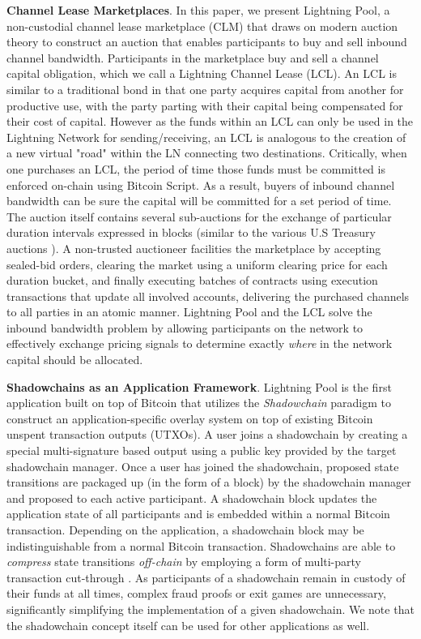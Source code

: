 \documentclass[10pt,a4paper]{article}
\theoremstyle{definition}
\begin{document}
\textbf{Channel Lease Marketplaces}. In this paper, we present Lightning Pool,
a non-custodial channel lease marketplace (CLM) that draws on modern auction
theory to construct an auction that enables participants to buy and sell
inbound channel bandwidth. Participants in the marketplace buy and sell a
channel capital obligation, which we call a Lightning Channel Lease (LCL). An
LCL is similar to a traditional bond in that one party acquires capital from
another for productive use, with the party parting with their capital being
compensated for their cost of capital. However as the funds within an LCL can
only be used in the Lightning Network for sending/receiving, an LCL is
analogous to the creation of a new virtual "road" within the LN connecting two
destinations. Critically, when one purchases an LCL, the period of time those
funds must be committed is enforced on-chain using Bitcoin Script. As a result,
buyers of inbound channel bandwidth can be sure the capital will be committed
for a set period of time. The auction itself contains several sub-auctions for
the exchange of particular duration intervals expressed in blocks (similar to
the various U.S Treasury auctions \cite{usTreasury}). A non-trusted auctioneer
facilities the marketplace by accepting sealed-bid orders, clearing the market
using a uniform clearing price for each duration bucket, and finally executing
batches of contracts using execution transactions that update all involved
accounts, delivering the purchased channels to all parties in an atomic manner.
Lightning Pool and the LCL solve the inbound bandwidth problem by allowing
participants on the network to effectively exchange pricing signals to
determine exactly \emph{where} in the network capital should be allocated.


\textbf{Shadowchains as an Application Framework}.  Lightning Pool is the first
application built on top of Bitcoin that utilizes the \emph{Shadowchain}
paradigm to construct an application-specific overlay system on top of existing
Bitcoin unspent transaction outputs (UTXOs). A user joins a shadowchain by
creating a special multi-signature based output using a public key provided by
the target shadowchain manager. Once a user has joined the shadowchain,
proposed state transitions are packaged up (in the form of a block) by the
shadowchain manager and proposed to each active participant. A shadowchain
block updates the application state of all participants and is embedded within
a normal Bitcoin transaction. Depending on the application, a shadowchain block
may be indistinguishable from a normal Bitcoin transaction. Shadowchains are
able to \emph{compress} state transitions \emph{off-chain} by employing a form
of multi-party transaction cut-through \cite{maxCutThru}. As participants of a
shadowchain remain in custody of their funds at all times, complex fraud proofs
or exit games are unnecessary, significantly simplifying the implementation of
a given shadowchain. We note that the shadowchain concept itself can be used
for other applications as well.
\end{document}
